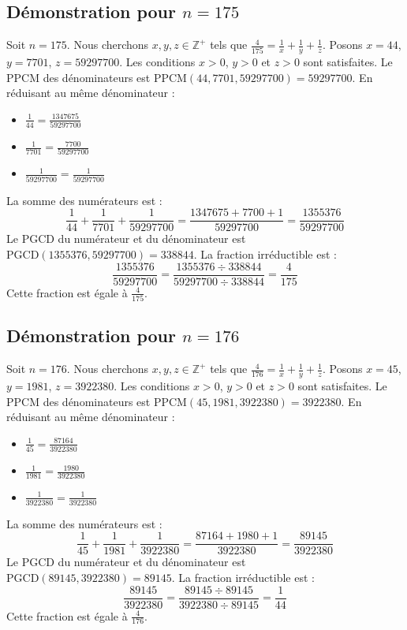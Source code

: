 \documentclass[11pt,a4paper]{article}
\begin{document}
\subsection{Démonstration pour $n = 175$}
Soit $n = 175$. Nous cherchons $x, y, z \in \mathbb{Z}^{+}$ tels que $\frac{4}{175} = \frac{1}{x} + \frac{1}{y} + \frac{1}{z}$.
Posons $x = 44$, $y = 7701$, $z = 59297700$.
Les conditions $x > 0$, $y > 0$ et $z > 0$ sont satisfaites.
Le PPCM des dénominateurs est $\text{PPCM}(44, 7701, 59297700) = 59297700$.
En réduisant au même dénominateur :
\begin{itemize}
    \item $\frac{1}{44} = \frac{1347675}{59297700}$
    \item $\frac{1}{7701} = \frac{7700}{59297700}$
    \item $\frac{1}{59297700} = \frac{1}{59297700}$
\end{itemize}
La somme des numérateurs est :
$$ \frac{1}{44} + \frac{1}{7701} + \frac{1}{59297700} = \frac{1347675 + 7700 + 1}{59297700} = \frac{1355376}{59297700} $$
Le PGCD du numérateur et du dénominateur est $\text{PGCD}(1355376, 59297700) = 338844$.
La fraction irréductible est :
$$ \frac{1355376}{59297700} = \frac{1355376 \div 338844}{59297700 \div 338844} = \frac{4}{175} $$
Cette fraction est égale à $\frac{4}{175}$.

\subsection{Démonstration pour $n = 176$}
Soit $n = 176$. Nous cherchons $x, y, z \in \mathbb{Z}^{+}$ tels que $\frac{4}{176} = \frac{1}{x} + \frac{1}{y} + \frac{1}{z}$.
Posons $x = 45$, $y = 1981$, $z = 3922380$.
Les conditions $x > 0$, $y > 0$ et $z > 0$ sont satisfaites.
Le PPCM des dénominateurs est $\text{PPCM}(45, 1981, 3922380) = 3922380$.
En réduisant au même dénominateur :
\begin{itemize}
    \item $\frac{1}{45} = \frac{87164}{3922380}$
    \item $\frac{1}{1981} = \frac{1980}{3922380}$
    \item $\frac{1}{3922380} = \frac{1}{3922380}$
\end{itemize}
La somme des numérateurs est :
$$ \frac{1}{45} + \frac{1}{1981} + \frac{1}{3922380} = \frac{87164 + 1980 + 1}{3922380} = \frac{89145}{3922380} $$
Le PGCD du numérateur et du dénominateur est $\text{PGCD}(89145, 3922380) = 89145$.
La fraction irréductible est :
$$ \frac{89145}{3922380} = \frac{89145 \div 89145}{3922380 \div 89145} = \frac{1}{44} $$
Cette fraction est égale à $\frac{4}{176}$.
\end{document}
